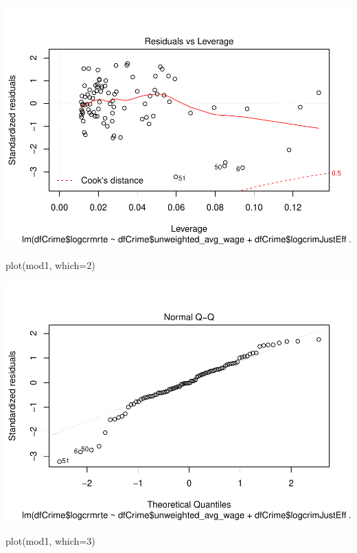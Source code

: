 \documentclass[]{article}
\newenvironment{Shaded}{}{}
\newcommand{\DataTypeTok}[1]{#1}
\newcommand{\DecValTok}[1]{#1}
\newcommand{\KeywordTok}[1]{\textcolor[rgb]{0.00,0.00,1.00}{#1}}
\newcommand{\NormalTok}[1]{#1}
\begin{document}
\includegraphics{Bagnard_Gaustad_Hartman_Leung_Lab_3_files/figure-latex/unnamed-chunk-81-1.pdf}

\begin{Shaded}
\begin{Highlighting}[]
\KeywordTok{plot}\NormalTok{(mod1, }\DataTypeTok{which=}\DecValTok{2}\NormalTok{)}
\end{Highlighting}
\end{Shaded}

\includegraphics{Bagnard_Gaustad_Hartman_Leung_Lab_3_files/figure-latex/unnamed-chunk-82-1.pdf}

\begin{Shaded}
\begin{Highlighting}[]
\KeywordTok{plot}\NormalTok{(mod1, }\DataTypeTok{which=}\DecValTok{3}\NormalTok{)}
\end{Highlighting}
\end{Shaded}
\end{document}
